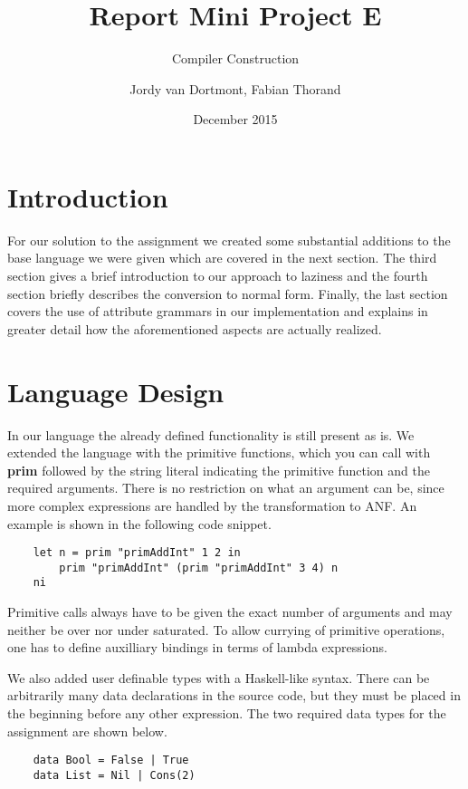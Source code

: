 \documentclass{scrartcl}
\title{Report Mini Project E}
\subtitle{Compiler Construction}
\author{Jordy van Dortmont, Fabian Thorand}
\date{December 2015}
\begin{document}
\maketitle

\section{Introduction}

For our solution to the assignment we created some substantial additions to the base language we were given which are covered in the next section.
The third section gives a brief introduction to our approach to laziness and the fourth section briefly describes the conversion to normal form.
Finally, the last section covers the use of attribute grammars in our implementation and explains in greater detail how the aforementioned aspects are actually realized.

\section{Language Design}
In our language the already defined functionality is still present as is. We extended the language with the primitive functions, which you can call with \textbf{prim} followed by the string literal indicating the primitive function and the required arguments. There is no restriction on what an argument can be, since more complex expressions are handled by the transformation to ANF. An example is shown in the following code snippet.

\begin{lstlisting}
    let n = prim "primAddInt" 1 2 in
        prim "primAddInt" (prim "primAddInt" 3 4) n
    ni
\end{lstlisting}

Primitive calls always have to be given the exact number of arguments and may neither be over nor under saturated.
To allow currying of primitive operations, one has to define auxilliary bindings in terms of lambda expressions.

We also added user definable types with a Haskell-like syntax. There can be arbitrarily many data declarations in the source code, but they must be placed in the beginning before any other expression. The two required data types for the assignment are shown below.

\begin{lstlisting}
    data Bool = False | True
    data List = Nil | Cons(2)
\end{lstlisting}
\end{document}
